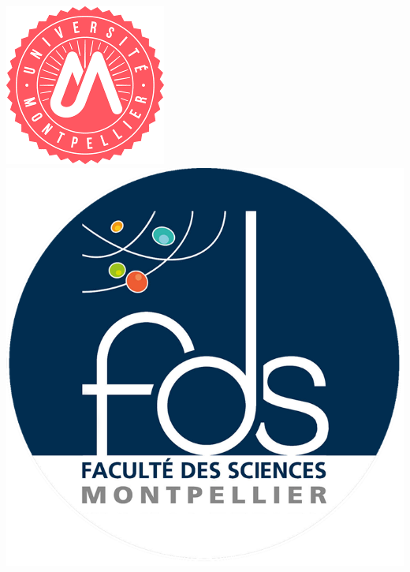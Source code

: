 \documentclass[frenchb]{report}
\newcommand{\1}{\mathbbm{1}}
\theoremstyle{definition}\newtheorem{defn}{Définition}
\theoremstyle{definition}\newtheorem{exm}{Exemple}
\theoremstyle{definition}\newtheorem{nota}{Notation}
\theoremstyle{definition}\newtheorem{rem}{Remarque}
\begin{document}
\def\appendixpage{\vspace*{8cm}
\begin{center}
\Huge\textbf{Annexes}
\end{center}
}
\def\appendixname{Annexe}%

\begin{titlepage}
\begin{center}
\includegraphics[scale=0.6]{logo.png}
\hfill
\includegraphics[scale=0.35]{fds_logo.png}
\hfill

\end{center}
\end{titlepage}
\end{document}
